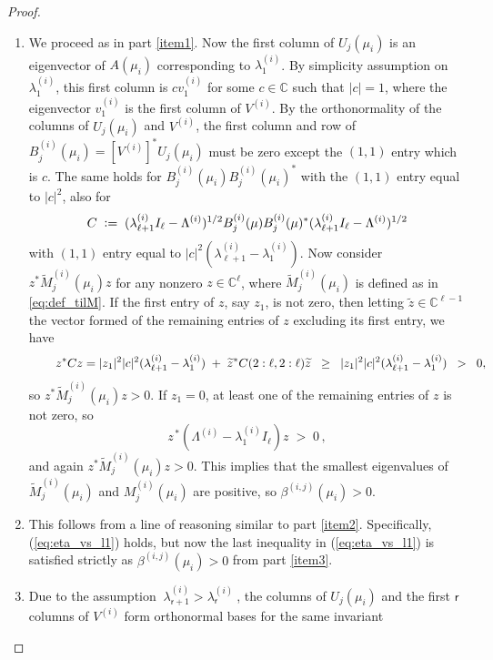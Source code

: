 \documentclass[10pt,a4paper]{amsart}
\newcommand{\sr}{\mathsf{r}}
\begin{document}
\begin{proof}
\begin{enumerate}
	\item We proceed as in part \ref{item1}. Now the first column of $U_j(\mu_i)$ is an
		eigenvector of $A(\mu_i)$ corresponding to $\lambda^{(i)}_1$. By simplicity
		assumption on $\lambda^{(i)}_1$, this first column is $c v^{(i)}_1$ for some
		$c \in {\mathbb C}$ such that $|c| = 1$, where the eigenvector $v^{(i)}_1$
		is the first column of $V^{(i)}$. By the orthonormality of the columns of $U_j(\mu_i)$
		and $V^{(i)}$, the first column and row of $B^{(i)}_j(\mu_i) = [ V^{(i)} ]^\ast U_j(\mu_i)$
		must be zero except the $(1,1)$ entry which is $c$. The same holds for 
		$B^{(i)}_j(\mu_i) B^{(i)}_j(\mu_i)^\ast$ with the $(1,1)$ entry equal to $| c |^2$, also for 
        \[C \;\vcentcolon=\; (\lambda^{(i)}_{\ell+1} I_\ell - \Lambda^{(i)})^{1/2} 
					B^{(i)}_j(\mu) B^{(i)}_j(\mu)^\ast (\lambda^{(i)}_{\ell+1} I_\ell - \Lambda^{(i)})^{1/2}
                    \]
		with $(1,1)$ entry equal to $|c|^2 (\lambda^{(i)}_{\ell+1} - \lambda^{(i)}_1)$. Now consider $z^\ast \widetilde{M}^{(i)}_j(\mu_i) z$ for any nonzero $z \in {\mathbb C}^{\ell}$,
		where $\widetilde{M}^{(i)}_j(\mu_i)$ is defined as in \eqref{eq:def_tilM}.
		If the first entry of $z$, say $z_1$, is not zero, then letting $\widetilde{z} \in {\mathbb C}^{\ell-1}$ 
		the vector formed of the remaining entries of $z$ excluding its first entry, we have
		\[
			\hskip 5ex
			z^\ast  C z = | z_1 |^2 |c|^2 (\lambda^{(i)}_{\ell+1} - \lambda^{(i)}_1)
					\;	+	\;
							\widetilde{z}^\ast C(2:\ell,2:\ell) \widetilde{z}
					\;\; \geq \;\;	| z_1 |^2 |c|^2 (\lambda^{(i)}_{\ell+1} - \lambda^{(i)}_1) \;\; > \;\; 0,
		\]
		so $z^\ast \widetilde{M}^{(i)}_j(\mu_i) z > 0$. If $z_1=0$, at least one
		of the remaining entries of $z$ is not zero, so
		\[
			z^{\, \ast}
			(\Lambda^{(i)} - \lambda^{(i)}_1 I_\ell)
			z	\;	>	\;	0 \,	,
		\]
		and again $z^\ast \widetilde{M}^{(i)}_j(\mu_i) z > 0$.
		This implies that the smallest eigenvalues of $\widetilde{M}^{(i)}_j(\mu_i)$
		and $M^{(i)}_j(\mu_i)$ are positive, so $\beta^{(i,j)}(\mu_i) > 0$.			
		\smallskip					
		\item 
		This follows from a line of reasoning similar to part \ref{item2}. Specifically,
		(\ref{eq:eta_vs_l1}) holds, but now the last inequality in (\ref{eq:eta_vs_l1}) 
		is satisfied strictly as $\beta^{(i,j)}(\mu_i) > 0$ from part \ref{item3}.		
		\smallskip
		\item Due to the assumption $\: \lambda^{(i)}_{\sr +1} > \lambda^{(i)}_{\sr} \:$, the columns of $U_j(\mu_i)$ 
		and the first $\sr$ columns of $V^{(i)}$ form orthonormal bases for the same invariant 

\end{enumerate}
\end{proof}
\end{document}
